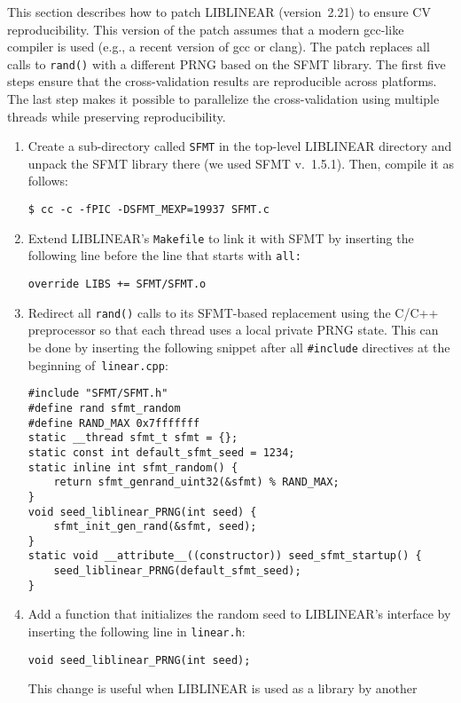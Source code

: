 This section describes how to patch LIBLINEAR (version~2.21) to ensure CV
reproducibility.
This version of the patch assumes that a modern gcc-like compiler is used
(e.g., a recent version of gcc or clang).
The patch replaces all calls to
\texttt{rand()} with a different PRNG based on
the SFMT library\supercite{saito2008simd}.
The first five steps ensure that the cross-validation results are reproducible
across platforms. The last step makes it possible to parallelize the
cross-validation using multiple threads while preserving reproducibility.
\begin{enumerate}
\item Create a sub-directory called \verb|SFMT| in the top-level LIBLINEAR
  directory and unpack the SFMT library there (we used SFMT
  v.~1.5.1). Then, compile it as follows:
\begin{Verbatim}[fontsize=\small]
$ cc -c -fPIC -DSFMT_MEXP=19937 SFMT.c
\end{Verbatim}
\item Extend LIBLINEAR's \verb|Makefile| to link it with SFMT by inserting the
  following line before the line that starts with \verb|all:|
\begin{Verbatim}[fontsize=\small]
override LIBS += SFMT/SFMT.o
\end{Verbatim}
\item Redirect all \verb|rand()| calls to its SFMT-based replacement using
  the C/C++ preprocessor so that each thread uses a local private PRNG state. This can be done by inserting the following snippet after all
  \verb|#include| directives at the beginning of~\verb|linear.cpp|:
\begin{Verbatim}[fontsize=\small]
#include "SFMT/SFMT.h"
#define rand sfmt_random
#define RAND_MAX 0x7fffffff
static __thread sfmt_t sfmt = {};
static const int default_sfmt_seed = 1234;
static inline int sfmt_random() {
    return sfmt_genrand_uint32(&sfmt) % RAND_MAX;
}
void seed_liblinear_PRNG(int seed) {
    sfmt_init_gen_rand(&sfmt, seed);
}
static void __attribute__((constructor)) seed_sfmt_startup() {
    seed_liblinear_PRNG(default_sfmt_seed);
}
\end{Verbatim}
\item Add a function that initializes the random seed to LIBLINEAR's interface by
  inserting the following line in \verb|linear.h|:
\begin{Verbatim}[fontsize=\small]
void seed_liblinear_PRNG(int seed);
\end{Verbatim}
  This change is useful when LIBLINEAR is used as a library by another

\end{enumerate}

